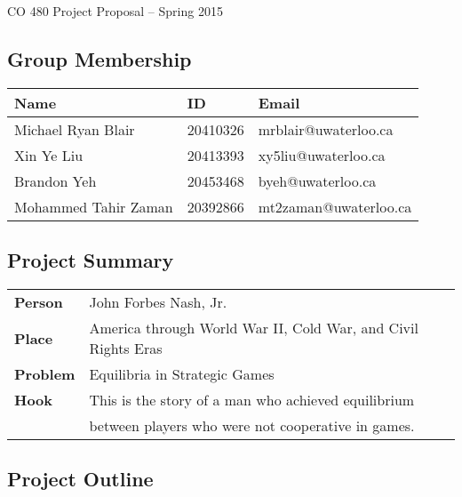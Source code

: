 \documentclass[11pt]{article}
\begin{document}
\begin{center}
{\Large CO 480 Project Proposal -- Spring 2015} 
\end{center}

\subsection*{Group Membership}
\begin{tabular}{|l|l|l|} \hline
\textbf{Name} & \textbf{ID} & \textbf{Emai}l \\ \hline
Michael Ryan Blair & 20410326 & mrblair@uwaterloo.ca \\ \hline
Xin Ye Liu & 20413393 & xy5liu@uwaterloo.ca\\ \hline
Brandon Yeh & 20453468 & byeh@uwaterloo.ca\\ \hline
Mohammed Tahir Zaman & 20392866 & mt2zaman@uwaterloo.ca\\ \hline
\end{tabular}

\subsection*{Project Summary}
\begin{tabular}{ll}
{\bf Person}  & John Forbes Nash, Jr. \\
{\bf Place}   & America through World War II, Cold War, and Civil Rights Eras\\
{\bf Problem} & Equilibria in Strategic Games \\
{\bf Hook }   & This is the story of a man who achieved equilibrium\\  & between players who were not cooperative in games.
\end{tabular}	

\subsection*{Project Outline}
\end{document}
